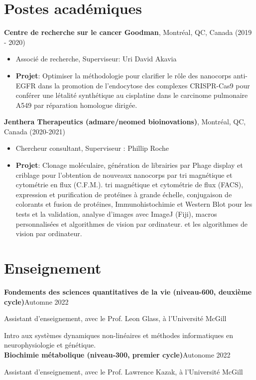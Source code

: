 \documentclass{article}
\newcommand{\cvsection}[1]{\section*{\rmfamily#1}}
\begin{document}
\cvsection{Postes académiques}
\indent

\textbf{Centre de recherche sur le cancer Goodman}, Montréal, QC, Canada \hfill (2019 - 2020)
\begin{itemize}
    \item[] Associé de recherche, Superviseur: Uri David Akavia
    \item[] \textbf{Projet}: Optimiser la méthodologie pour clarifier le rôle des nanocorps anti-EGFR dans la promotion de l'endocytose des complexes CRISPR-Cas9 pour conférer une létalité synthétique au cisplatine dans le carcinome pulmonaire A549 par réparation homologue dirigée.
\end{itemize}

\textbf{Jenthera Therapeutics (admare/neomed bioinovations)}, Montréal, QC, Canada \hfill (2020-2021)
\begin{itemize}
    \setlength{\emergencystretch}{2em}
    \item[] Chercheur consultant, Superviseur : Phillip Roche
    \item[] \textbf{Projet}: Clonage moléculaire, génération de librairies par Phage display et criblage pour l'obtention de nouveaux nanocorps par tri magnétique et cytométrie en flux (C.F.M.). tri magnétique et cytométrie de flux (FACS), expression et purification de protéines à grande échelle, conjugaison de colorants et fusion de protéines, Immunohistochimie et Western Blot pour les tests et la validation, analyse d'images avec ImageJ (Fiji), macros personnalisées et algorithmes de vision par ordinateur. et les algorithmes de vision par ordinateur.
\end{itemize}


\cvsection{Enseignement}
\indent

\textbf{Fondements des sciences quantitatives de la vie (niveau-600, deuxième cycle)}\hfill Automne 2022

\hspace{2em}Assistant d'enseignement, avec le Prof. Leon Glass, à l'Université McGill

\hspace{2em}Intro aux systèmes dynamiques non-linéaires et méthodes informatiques en neurophysiologie et génétique.\\

\textbf{Biochimie métabolique (niveau-300, premier cycle)}\hfill Autonome 2022

\hspace{2em}Assistant d'enseignement, avec le Prof. Lawrence Kazak, à l'Université McGill
\end{document}
